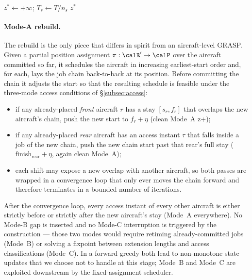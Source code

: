 \begin{algorithm}[htbp]
\DontPrintSemicolon
{}
$z^* \leftarrow +\infty$; $T_s \leftarrow T / n_s$\;
\Return $z^*$\;
\caption{Topology-aware GRASP for the job-level problem
         with multi-start ($n_s$ restarts).}
\label{alg:topo}
\end{algorithm}

\paragraph{Mode-A rebuild.}
The rebuild is the only piece that differs in spirit from an
aircraft-level GRASP.  Given a partial position assignment
$\pi : \calR' \to \calP$ over the aircraft committed so far, it
schedules the aircraft in increasing earliest-start order and, for
each, lays the job chain back-to-back at its position.  Before
committing the chain it adjusts the start so that the resulting
schedule is feasible under the three-mode access conditions of
\S\ref{subsec:access}:
\begin{itemize}[leftmargin=2em, itemsep=0pt]
  \item if any already-placed \emph{front} aircraft $r$ has a stay
        $[s_r, f_r]$ that overlaps the new aircraft's chain, push the
        new start to $f_r + \eta$ (clean Mode~A z+);
  \item if any already-placed \emph{rear} aircraft has an access
        instant $\tau$ that falls inside a job of the new chain, push
        the new chain start past that rear's full stay
        ($\mathrm{finish}_{\mathrm{rear}} + \eta$, again clean Mode~A);
  \item each shift may expose a new overlap with another aircraft, so
        both passes are wrapped in a convergence loop that only ever
        moves the chain forward and therefore terminates in a bounded
        number of iterations.
\end{itemize}
After the convergence loop, every access instant of every other
aircraft is either strictly before or strictly after the new
aircraft's stay (Mode~A everywhere).  No Mode-B gap is inserted and no
Mode-C interruption is triggered by the construction --- those two
modes would require retiming already-committed jobs (Mode~B) or
solving a fixpoint between extension lengths and access classifications
(Mode~C).  In a forward greedy both lead to non-monotone state updates
that we choose not to handle at this stage; Mode~B and Mode~C are
exploited downstream by the fixed-assignment scheduler.

